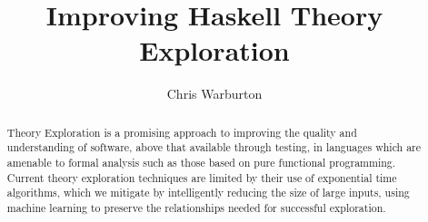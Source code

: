 \documentclass[]{article}
\begin{document}
\pagestyle{headings}  %

\title{Improving Haskell Theory Exploration}

\author{Chris Warburton}


\maketitle              %

\begin{abstract}
Theory Exploration is a promising approach to improving the quality and understanding of software, above that available through testing, in languages which are amenable to formal analysis such as those based on pure functional programming. Current theory exploration techniques are limited by their use of exponential time algorithms, which we mitigate by intelligently reducing the size of large inputs, using machine learning to preserve the relationships needed for successful exploration.
\end{abstract}








\iffalse TODO: Section that brings back ML discussion to TE is missing \fi



\end{document}
